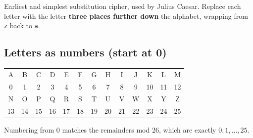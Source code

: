 \documentclass[10pt,a4paper]{article}
\newcommand{\ttx}[1]{\texttt{#1}}
\begin{document}
\begin{keybox}
Earliest and simplest substitution cipher, used by Julius Caesar. Replace each letter with the letter \textbf{three places further down} the alphabet, wrapping from \ttx{z} back to \ttx{a}.
\end{keybox}

\subsection{Letters as numbers (start at 0)}
\begin{center}\small\setlength{\tabcolsep}{4pt}
\begin{tabular}{*{13}{c}}
\toprule
A&B&C&D&E&F&G&H&I&J&K&L&M\\
0&1&2&3&4&5&6&7&8&9&10&11&12\\
\midrule
N&O&P&Q&R&S&T&U&V&W&X&Y&Z\\
13&14&15&16&17&18&19&20&21&22&23&24&25\\
\bottomrule
\end{tabular}
\end{center}
Numbering from 0 matches the remainders mod 26, which are exactly $0,1,\dots,25$.
\end{document}

